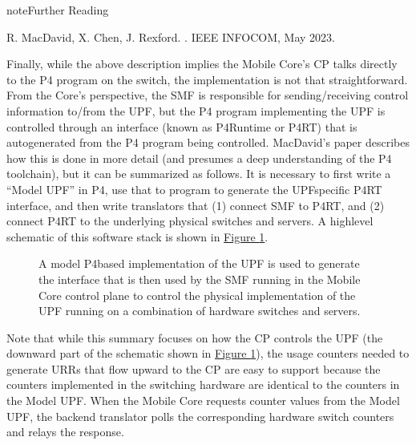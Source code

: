\documentclass[a4paper,11pt,english]{sphinxmanual}
\let\sphinxpxdimen\pdfpxdimen\else\newdimen\sphinxpxdimen
\begin{document}
\label{\detokenize{core:reading-p4-qos}}
\begin{sphinxadmonition}{note}{Further Reading}

\sphinxAtStartPar
R. MacDavid, X. Chen, J. Rexford. .
IEEE INFOCOM, May 2023.
\end{sphinxadmonition}

\sphinxAtStartPar
Finally, while the above description implies the Mobile Core’s CP
talks directly to the P4 program on the switch, the implementation is
not that straightforward. From the Core’s perspective, the SMF is
responsible for sending/receiving control information to/from the UPF,
but the P4 program implementing the UPF is controlled through an
interface (known as P4Runtime or P4RT) that is auto\sphinxhyphen{}generated from the
P4 program being controlled. MacDavid’s paper describes how this is
done in more detail (and presumes a deep understanding of the P4
toolchain), but it can be summarized as follows. It is necessary to
first write a “Model UPF” in P4, use that to program to generate the
UPF\sphinxhyphen{}specific P4RT interface, and then write translators that (1)
connect SMF to P4RT, and (2) connect P4RT to the underlying physical
switches and servers. A high\sphinxhyphen{}level schematic of this software stack is
shown in \hyperref[\detokenize{core:fig-p4-upf}]{Figure \ref{\detokenize{core:fig-p4-upf}}}.

\begin{figure}[ht]
\centering
\capstart

\noindent\sphinxincludegraphics[width=500\sphinxpxdimen]{{Slide23}.png}
\caption{A model P4\sphinxhyphen{}based implementation of the UPF is used to generate the
interface that is then used by the SMF running in the Mobile Core
control plane to control the physical implementation of the UPF
running on a combination of hardware switches and servers.}\label{\detokenize{core:id7}}\label{\detokenize{core:fig-p4-upf}}\end{figure}

\sphinxAtStartPar
Note that while this summary focuses on how the CP controls the UPF
(the downward part of the schematic shown in \hyperref[\detokenize{core:fig-p4-upf}]{Figure \ref{\detokenize{core:fig-p4-upf}}}), the usage counters needed to generate URRs that flow
upward to the CP are easy to support because the counters implemented
in the switching hardware are identical to the counters in the Model
UPF. When the Mobile Core requests counter values from the Model UPF,
the backend translator polls the corresponding hardware switch
counters and relays the response.
\end{document}
